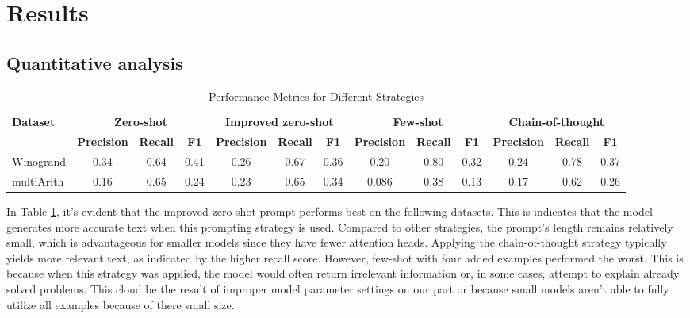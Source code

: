 \documentclass[fleqn,moreauthors,10pt]{ds_report}
\begin{document}
\section*{Results}
\subsection*{Quantitative analysis}

\begin{table}[!htbp]
\centering

\begin{adjustbox}{width=\columnwidth}
\begin{tabular}{@{}lcccccccccccc@{}}
\toprule
\textbf{Dataset} & \multicolumn{3}{c}{\textbf{Zero-shot}} & \multicolumn{3}{c}{\textbf{Improved zero-shot}} & \multicolumn{3}{c}{\textbf{Few-shot}} & \multicolumn{3}{c}{\textbf{Chain-of-thought}} \\
 & \textbf{Precision} & \textbf{Recall} & \textbf{F1} & \textbf{Precision} & \textbf{Recall} & \textbf{F1} & \textbf{Precision} & \textbf{Recall} & \textbf{F1} & \textbf{Precision} & \textbf{Recall} & \textbf{F1} \\ \midrule
Winogrand & 0.34 & 0.64 & 0.41 & 0.26 & 0.67 & 0.36 & 0.20 & 0.80 & 0.32 & 0.24 & 0.78 & 0.37 \\
multiArith & 0.16 &  0.65 & 0.24 & 0.23 & 0.65 & 0.34 & 0.086 & 0.38 & 0.13 & 0.17 & 0.62 & 0.26 \\ \bottomrule
\end{tabular}
\end{adjustbox}
\caption{Performance Metrics for Different Strategies}
\label{tab:performance_metrics}
\end{table}

In Table \ref{tab:performance_metrics}, it's evident that the improved zero-shot prompt performs best on the following datasets. This is indicates that the model generates more accurate text when this prompting strategy is used. Compared to other strategies, the prompt's length remains relatively small, which is advantageous for smaller models since they have fewer attention heads. Applying the chain-of-thought strategy typically yields more relevant text, as indicated by the higher recall score. However, few-shot with four added examples performed the worst. This is because when this strategy was applied, the model would often return irrelevant information or, in some cases, attempt to explain already solved problems. This cloud be the result of improper model parameter settings on our part or because small models aren't able to fully utilize all examples because of there small size.
\end{document}
